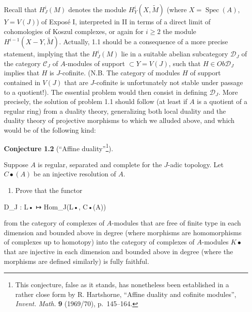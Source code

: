 \documentclass[
  11pt,
  a4paper,
]{book}
\newenvironment{Shaded}{}{}
\newcommand{\NormalTok}[1]{#1}
\newcounter{none} %
\providecommand{\tightlist}{%
  \setlength{\itemsep}{0pt}\setlength{\parskip}{0pt}}
\begin{document}
Recall that \(H^{i}_{J}(M)\) denotes the module
\(H^{i}_{Y}(X, \tilde{M})\) (where \(X = \operatorname{Spec}(A)\),
\(Y = V(J)\)) of Exposé I, interpreted in II in terms of a direct limit
of cohomologies of Koszul complexes, or again for \(i \geqslant
2\) the module \(H^{i-1}(X - Y, \tilde{M})\). Actually, 1.1 should be a
consequence of a more precise statement, implying that the
\(H^{i}_{J}(M)\) lie in a suitable abelian subcategory
\(\mathcal{D}_{J}\) of the category \(\mathcal{C}_{J}\) of \(A\)-modules
of support \(\subset Y = V(J)\), such that \(H \in Ob \mathcal{D}_{J}\)
implies that \(H\) is \(J\)-cofinite. (N.B. The category of modules
\(H\) of support contained in \(V(J)\) that are \(J\)-cofinite is
unfortunately not stable under passage to a quotient!). The essential
problem would then consist in defining \(\mathcal{D}_{J}\). More
precisely, the solution of problem 1.1 should follow (at least if \(A\)
is a quotient of a regular ring) from a duality theory, generalizing
both local duality and the duality theory of projective morphisms to
which we alluded above, and which would be of the following kind:

\textbf{Conjecture 1.2} (``Affine duality''\footnote{This conjecture,
  false as it stands, has nonetheless been established in a rather close
  form by R. Hartshorne, ``Affine duality and cofinite modules'',
  \emph{Invent. Math.} \textbf{9} (1969/70), p.~145--164.}).

Suppose \(A\) is regular, separated and complete for the \(J\)-adic
topology. Let \(C\bullet(A)\) be an injective resolution of \(A\).

\begin{enumerate}
\def\labelenumi{(\roman{enumi})}
\tightlist
\item
  Prove that the functor
\end{enumerate}

\begin{Shaded}
\begin{Highlighting}[]
\NormalTok{D\_J : L• ↦ Hom\_J(L•, C•(A))}
\end{Highlighting}
\end{Shaded}

from the category of complexes of \(A\)-modules that are free of finite
type in each dimension and bounded above in degree (where morphisms are
homomorphisms of complexes up to homotopy) into the category of
complexes of \(A\)-modules \(K\bullet\) that are injective in each
dimension and bounded above in degree (where the morphisms are defined
similarly) is fully faithful.
\end{document}

